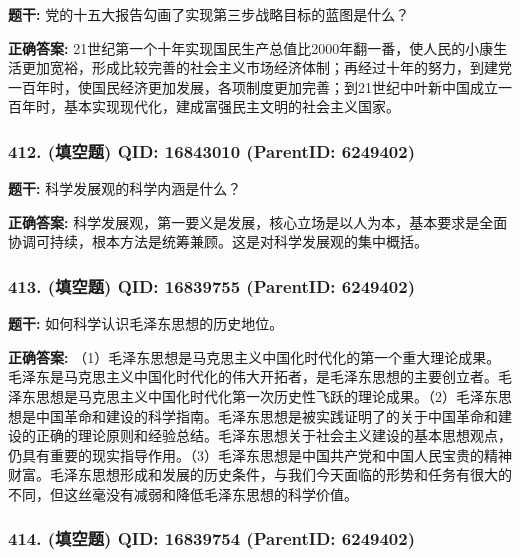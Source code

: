\documentclass[12pt,UTF8]{ctexart}
\begin{document}
\textbf{题干:}
党的十五大报告勾画了实现第三步战略目标的蓝图是什么？



\textbf{正确答案:}
21世纪第一个十年实现国民生产总值比2000年翻一番，使人民的小康生活更加宽裕，形成比较完善的社会主义市场经济体制；再经过十年的努力，到建党一百年时，使国民经济更加发展，各项制度更加完善；到21世纪中叶新中国成立一百年时，基本实现现代化，建成富强民主文明的社会主义国家。

\vspace{0.3em}\hrulefill\vspace{0.7em}

\subsubsection*{412. (填空题) \small QID: 16843010 (ParentID: 6249402)}

\textbf{题干:}
科学发展观的科学内涵是什么？



\textbf{正确答案:}
科学发展观，第一要义是发展，核心立场是以人为本，基本要求是全面协调可持续，根本方法是统筹兼顾。这是对科学发展观的集中概括。

\vspace{0.3em}\hrulefill\vspace{0.7em}

\subsubsection*{413. (填空题) \small QID: 16839755 (ParentID: 6249402)}

\textbf{题干:}
如何科学认识毛泽东思想的历史地位。



\textbf{正确答案:}
（1）毛泽东思想是马克思主义中国化时代化的第一个重大理论成果。毛泽东是马克思主义中国化时代化的伟大开拓者，是毛泽东思想的主要创立者。毛泽东思想是马克思主义中国化时代化第一次历史性飞跃的理论成果。（2）毛泽东思想是中国革命和建设的科学指南。毛泽东思想是被实践证明了的关于中国革命和建设的正确的理论原则和经验总结。毛泽东思想关于社会主义建设的基本思想观点，仍具有重要的现实指导作用。（3）毛泽东思想是中国共产党和中国人民宝贵的精神财富。毛泽东思想形成和发展的历史条件，与我们今天面临的形势和任务有很大的不同，但这丝毫没有减弱和降低毛泽东思想的科学价值。

\vspace{0.3em}\hrulefill\vspace{0.7em}

\subsubsection*{414. (填空题) \small QID: 16839754 (ParentID: 6249402)}
\end{document}
